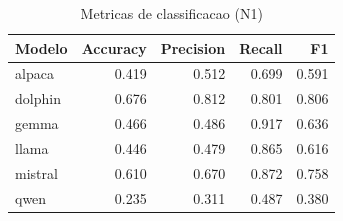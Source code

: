 \begin{table}[ht]
  \centering
  \caption{Metricas de classificacao (N1)}
  \label{tab:results_n1_classification}
  \begin{tabular}{lrrrr}
    \toprule
    Modelo & Accuracy & Precision & Recall & F1 \\
    \midrule
    alpaca & 0.419 & 0.512 & 0.699 & 0.591 \\
    dolphin & 0.676 & 0.812 & 0.801 & 0.806 \\
    gemma & 0.466 & 0.486 & 0.917 & 0.636 \\
    llama & 0.446 & 0.479 & 0.865 & 0.616 \\
    mistral & 0.610 & 0.670 & 0.872 & 0.758 \\
    qwen & 0.235 & 0.311 & 0.487 & 0.380 \\
    \bottomrule
  \end{tabular}
\end{table}
